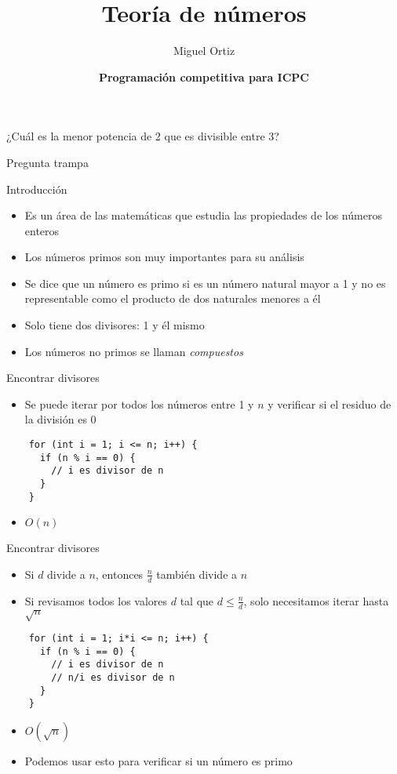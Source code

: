 \documentclass[10pt]{beamer}
\title{Teoría de números}
\author{Miguel Ortiz}
\institute{Octubre 2023}
\date{\textbf{Programación competitiva para ICPC}}
\newcommand{\bi}{\begin{itemize}}
\newcommand{\ei}{\end{itemize}}
\begin{document}
\maketitle

\begin{frame}
  \begin{center}
    ¿Cuál es la menor potencia de 2 que es divisible entre 3?
    
    \vspace{20pt}

     Pregunta trampa
  \end{center}
\end{frame}

\begin{frame}{Introducción}
  \bi
    \item Es un área de las matemáticas que estudia las propiedades de los números enteros
    \item Los números primos son muy importantes para su análisis
    
    \vspace{20pt}

    \item<2-> Se dice que un número es primo si es un número natural mayor a 1 y no es representable como el producto de dos naturales menores a él
    \item<2-> Solo tiene dos divisores: 1 y él mismo
    \item<3-> Los números no primos se llaman \textit{compuestos}
  \ei
\end{frame}

\begin{frame}[fragile]{Encontrar divisores}
  \bi
    \item Se puede iterar por todos los números entre 1 y $n$ y verificar si el residuo de la división es 0
  \ei
  \begin{verbatim}
    for (int i = 1; i <= n; i++) {
      if (n % i == 0) {
        // i es divisor de n
      }
    }
  \end{verbatim}
  \bi
    \item $O(n)$
  \ei
\end{frame}

\begin{frame}[fragile]{Encontrar divisores}
  \bi
    \item Si $d$ divide a $n$, entonces $\frac{n}{d}$ también divide a $n$
    \item Si revisamos todos los valores $d$ tal que $d \leq \frac{n}{d}$, solo necesitamos iterar hasta $\sqrt{n}$
  \ei
  \begin{verbatim}
    for (int i = 1; i*i <= n; i++) {
      if (n % i == 0) {
        // i es divisor de n
        // n/i es divisor de n
      }
    }
  \end{verbatim}
  \bi
    \item $O(\sqrt{n})$
    \item<2-> Podemos usar esto para verificar si un número es primo
  \ei
\end{frame}
\end{document}
